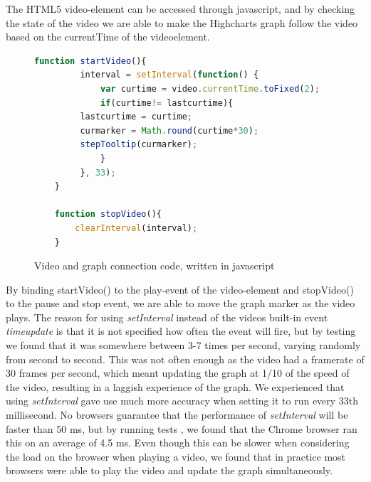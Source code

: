 The HTML5 video-element can be accessed through javascript, and by checking the state of the video we are able to make the Highcharts graph follow the video based on the currentTime of the videoelement.

\begin{figure}
	\begin{lstlisting}[language=javascript]
	function startVideo(){
	     interval = setInterval(function() {
	         var curtime = video.currentTime.toFixed(2);
	         if(curtime!= lastcurtime){
		 lastcurtime = curtime;
		 curmarker = Math.round(curtime*30);
		 stepTooltip(curmarker);
	         }
	     }, 33);
	}

	function stopVideo(){
		clearInterval(interval);
	}
	\end{lstlisting}
	\caption{Video and graph connection code, written in javascript}
	\label{fig:videocode}
\end{figure}

By binding startVideo() to the play-event of the video-element and stopVideo() to the pause and stop event, we are able to move the graph marker as the video plays. The reason for using \emph{setInterval} instead of the videos built-in event \emph{timeupdate} is that it is not specified how often the event will fire, but by testing we found that it was somewhere between 3-7 times per second, varying randomly from second to second. This was not often enough as the video had a framerate of 30 frames per second, which meant updating the graph at 1/10 of the speed of the video, resulting in a laggish experience of the graph. We experienced that using \emph{setInterval} gave use much more accuracy when setting it to run every 33th millisecond. No browsers guarantee that the performance of \emph{setInterval} will be faster than 50 ms, but by running tests \citep{adequatleyqood}, we found that the Chrome browser ran this on an average of 4.5 ms. Even though this can be slower when considering the load on the browser when playing a video, we found that in practice most browsers were able to play the video and update the graph simultaneously. 
